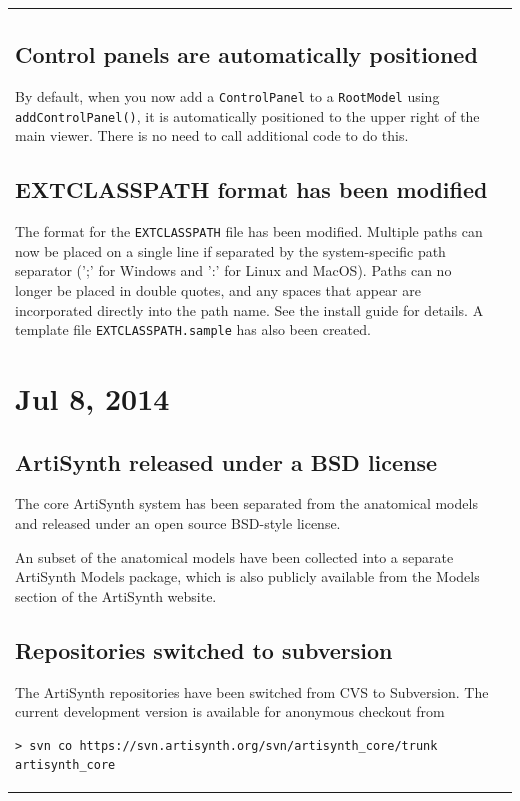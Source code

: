 \documentclass{article}
\begin{document}
\begin{tabular}{ll}
\subsection*{Control panels are automatically positioned}

By default, when you now add a {\tt ControlPanel} to a {\tt RootModel}
using {\tt addControlPanel()}, it is automatically positioned to the
upper right of the main viewer.  There is no need to call additional
code to do this.

\subsection*{EXTCLASSPATH format has been modified}

The format for the {\tt EXTCLASSPATH} file has been modified. Multiple
paths can now be placed on a single line if separated by the
system-specific path separator (';' for Windows and ':' for Linux and
MacOS). Paths can no longer be placed in double quotes, and any spaces
that appear are incorporated directly into the path name. See the
install guide for details. A template file {\tt EXTCLASSPATH.sample}
has also been created.

\section*{Jul 8, 2014}

\subsection*{ArtiSynth released under a BSD license}

The core ArtiSynth system has been separated from the anatomical
models and released under an open source BSD-style license.

An subset of the anatomical models have been collected into a separate
ArtiSynth Models package, which is also publicly available from the
{\sf Models} section of the ArtiSynth website.

\subsection*{Repositories switched to subversion}

The ArtiSynth repositories have been switched from CVS to Subversion.
The current development version is available for anonymous checkout
from
\begin{verbatim}
> svn co https://svn.artisynth.org/svn/artisynth_core/trunk artisynth_core
\end{verbatim}


\end{tabular}
\end{document}
